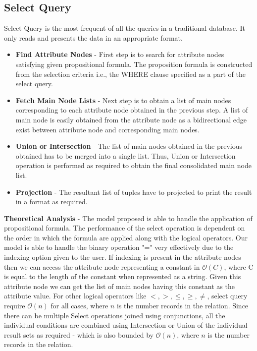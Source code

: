 \documentclass[12pt, oneside]{book}
\begin{document}
\subsection{Select Query}
Select Query is the most frequent of all the queries in a traditional database. It only reads and presents the data in an appropriate format.
 \begin{itemize}
  \item \textbf{Find Attribute Nodes} - First step is to search for attribute nodes satisfying given propositional formula. The proposition formula is constructed from the selection criteria i.e., the WHERE clause specified as a part of the select query.
  \item \textbf{Fetch Main Node Lists} - Next step is to obtain a list of main nodes corresponding to each attribute node obtained in the previous step. A list of main node is easily obtained from the attribute node as a bidirectional edge exist between attribute node and corresponding main nodes.
  \item \textbf{Union or Intersection} - The list of main nodes obtained in the previous obtained has to be merged into a single list. Thus, Union or Intersection operation is performed as required to obtain the final consolidated main node list.
  \item \textbf{Projection} - The resultant list of tuples have to projected to print the result in a format as required.
 \end{itemize}
 \par \textbf{Theoretical Analysis} - The model proposed is able to handle the application of propositional formula.
 The performance of the select operation is dependent on the order in which the formula are applied along with the logical operators.
 Our model is able to handle the binary operation "=" very effectively due to the indexing option given to the user. 
 If indexing is present in the attribute nodes then we can access the attribute node representing a constant in $\mathcal{O}(C)$, where C is equal to the length of the constant when represented as a string. Given this attribute node
 we can get the list of main nodes having this constant as the attribute value. For other logical operators like $ <, >, \leq, \geq, \neq$, select query require $\mathcal{O}(n)$ for all cases, where $n$ is the number records in the relation. Since there can be multiple Select operations joined using conjunctions, all the individual conditions are combined using Intersection or Union of the individual result sets as required - which is also bounded by $\mathcal{O}(n)$, where $n$ is the number records in the relation.
\end{document}
